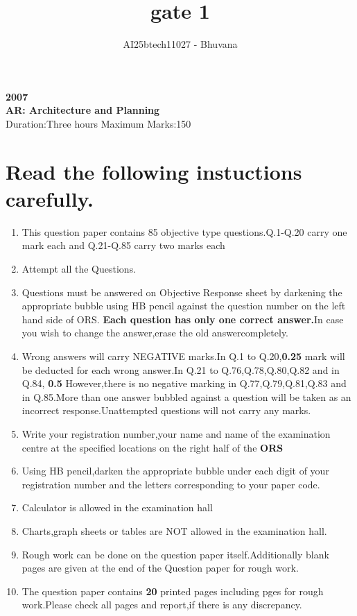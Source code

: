 \documentclass[journal,12pt,onecolumn]{IEEEtran}
\theoremstyle{remark}
\begin{document}
\title{gate 1}
\author{AI25btech11027 - Bhuvana}
\maketitle
\renewcommand{\thefigure}{\theenumi}
\renewcommand{\thetable}{\theenumi}
\begin {center}
\large \textbf{2007}\\
\large \textbf{AR: Architecture and Planning}\\
{Duration:Three hours \hfill Maximum Marks:150}
\end{center}
\section{\textbf{Read the following instuctions carefully.}}
\begin{enumerate}
  \item This question paper contains 85 objective type questions.Q.1-Q.20 carry one mark each and Q.21-Q.85 carry two marks each
  \item Attempt all the Questions.
  \item Questions must be answered on Objective Response sheet  by darkening the appropriate bubble  using HB pencil against the question number on the left hand side of ORS.
  \textbf{Each question has only one correct answer.}In case you wish to change the answer,erase the old answercompletely.
  \item Wrong answers will carry NEGATIVE marks.In Q.1 to Q.20,\textbf {0.25}  mark will be deducted for each wrong answer.In Q.21 to Q.76,Q.78,Q.80,Q.82 and in Q.84, \textbf{0.5} However,there is no negative marking in Q.77,Q.79,Q.81,Q.83 and in Q.85.More than one answer bubbled against a question will be taken as an incorrect response.Unattempted questions will not carry any marks.
  \item Write your registration number,your name and name of the examination centre at the specified locations on the right half of the   \textbf{ORS}
  \item Using HB pencil,darken the appropriate bubble under each digit of your registration number and the letters corresponding to your paper code.
 \item Calculator is allowed in the examination hall
   \item Charts,graph sheets or tables are NOT allowed in the examination hall. 
   \item Rough work can be done on the question paper itself.Additionally blank pages are given at the end of the Question paper for rough work.
   \item The question paper contains \textbf{20} printed pages including pges for rough work.Please check all pages and report,if there is any discrepancy.
   \end{enumerate}
     
\end{document}

